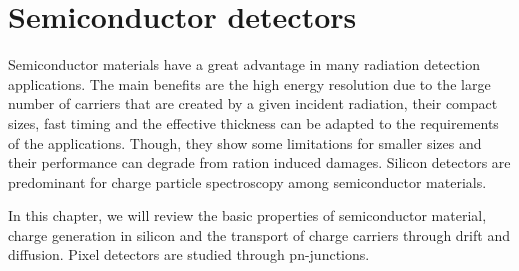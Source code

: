 \chapter{Semiconductor detectors}
\label{sec:SiliconTheory}

Semiconductor materials have a great advantage in many radiation
detection applications. The main benefits are the high energy
resolution due to the large number of carriers that are created by a
given incident radiation, their compact sizes, fast timing and the
effective thickness can be adapted to the requirements of the
applications. Though, they show some limitations for smaller sizes and
their performance can degrade from ration induced damages. Silicon
detectors are predominant for charge particle spectroscopy among
semiconductor materials. 

In this chapter, we will review the basic properties of semiconductor
material, charge generation in silicon and the transport of charge
carriers through drift and diffusion. Pixel detectors are studied
through pn-junctions. 

